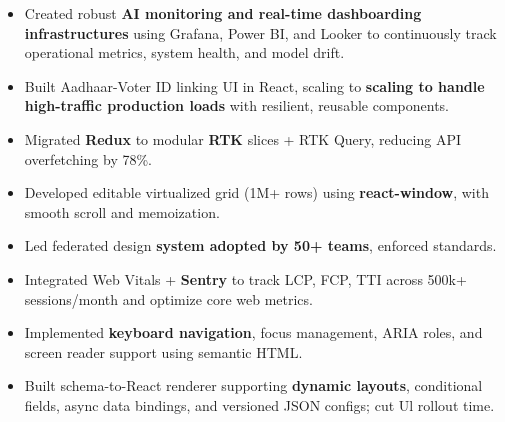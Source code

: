 \documentclass[100pt,a4paper]{article}
\begin{document}
\begin{itemize}
\item {Created robust \textbf{AI monitoring and real-time dashboarding infrastructures} using Grafana, Power BI, and Looker to continuously track operational metrics, system health, and model drift.}
\item {Built Aadhaar-Voter ID linking UI in React, scaling to \textbf{scaling to handle high-traffic production loads} with resilient, reusable components.}
\item {Migrated \textbf{Redux} to modular \textbf{RTK} slices + RTK Query, reducing API overfetching by 78\%.}
\item {Developed editable virtualized grid (1M+ rows) using \textbf{react-window}, with smooth scroll and memoization.}
\item {Led federated design \textbf{system adopted by 50+ teams}, enforced standards.}
\item {Integrated Web Vitals + \textbf{Sentry} to track LCP, FCP, TTI across 500k+ sessions/month and optimize core web metrics.}
\item {Implemented \textbf{keyboard navigation}, focus management, ARIA roles, and screen reader support using semantic HTML.}
\item {Built schema-to-React renderer supporting \textbf{dynamic layouts}, conditional fields, async data bindings, and versioned JSON configs; cut Ul rollout time.}
\end{itemize}
\end{document}

